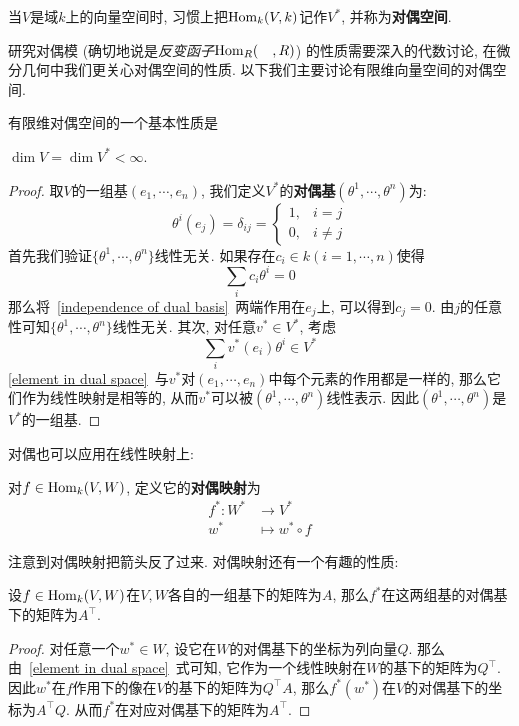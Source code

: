 \begin{sym}
    当$V$是域$k$上的向量空间时, 习惯上把$\operatorname{Hom}_k(V,k)$记作$V^*$, 并称为\textbf{对偶空间}.
\end{sym}

研究对偶模 (确切地说是\textit{反变函子}$\operatorname{Hom}_R(\quad,R)$) 的性质需要深入的代数讨论, 在微分几何中我们更关心对偶空间的性质.
以下我们主要讨论有限维向量空间的对偶空间.

有限维对偶空间的一个基本性质是
\begin{prop}\label{dim of dual space}
    $\dim V=\dim V^*<\infty$.
\end{prop}
\begin{proof}
    取$V$的一组基$(e_1,\cdots,e_n)$, 我们定义$V^*$的\textbf{对偶基}$(\theta^1,\cdots,\theta^n)$为:
    \[\theta^i(e_j)=\delta_{ij}=\begin{cases}
        1, & i=j\\
        0, & i\neq j
    \end{cases}\]
    首先我们验证$\{\theta^1,\cdots,\theta^n\}$线性无关.
    如果存在$c_i\in k(i=1,\cdots,n)$使得
    \begin{equation}
        \sum_ic_i\theta^i=0\label{independence of dual basis}
    \end{equation}
    那么将~\eqref{independence of dual basis}~两端作用在$e_j$上, 可以得到$c_j=0$.
    由$j$的任意性可知$\{\theta^1,\cdots,\theta^n\}$线性无关.
    其次, 对任意$v^*\in V^*$, 考虑
    \begin{equation}
        \sum_{i}v^*(e_i)\theta^i\in V^*\label{element in dual space}
    \end{equation}
    \eqref{element in dual space}~与$v^*$对$(e_1,\cdots,e_n)$中每个元素的作用都是一样的, 那么它们作为线性映射是相等的,
    从而$v^*$可以被$(\theta^1,\cdots,\theta^n)$线性表示.
    因此$(\theta^1,\cdots,\theta^n)$是$V^*$的一组基.
\end{proof}

对偶也可以应用在线性映射上:
\begin{defn}
    对$f\in\operatorname{Hom}_k(V,W)$, 定义它的\textbf{对偶映射}为
    \begin{align*}
        f^*:W^*&\to V^*\\
        w^*&\mapsto w^*\circ f
    \end{align*}
\end{defn}
注意到对偶映射把箭头反了过来.
对偶映射还有一个有趣的性质:
\begin{prop}
    设$f\in\operatorname{Hom}_k(V,W)$在$V,W$各自的一组基下的矩阵为$A$, 那么$f^*$在这两组基的对偶基下的矩阵为$A^\top$.
\end{prop}
\begin{proof}
    对任意一个$w^*\in W$, 设它在$W$的对偶基下的坐标为列向量$Q$.
    那么由~\eqref{element in dual space}~式可知, 它作为一个线性映射在$W$的基下的矩阵为$Q^\top$.
    因此$w^*$在$f$作用下的像在$V$的基下的矩阵为$Q^\top A$, 那么$f^*(w^*)$在$V$的对偶基下的坐标为$A^\top Q$.
    从而$f^*$在对应对偶基下的矩阵为$A^\top$.
\end{proof}

